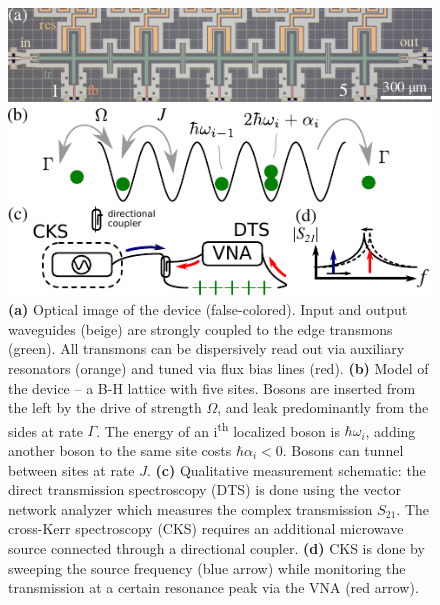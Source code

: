 \documentclass[%
 aps, prl,
 amsmath,amssymb,
 reprint,%
superscriptaddress
]{revtex4-2}
\begin{document}
\begin{figure}
	\centering
	\includegraphics[width=1\linewidth]{scheme.pdf}
	\caption{\textbf{(a)} Optical image of the device (false-colored). Input and output waveguides (beige) are strongly coupled to the edge transmons (green). All transmons can be dispersively read out via auxiliary resonators (orange) and tuned via flux bias lines (red). \textbf{(b)} Model of the device -- a B-H lattice with five sites. Bosons are inserted from the left by the drive of strength $\Omega$, and leak predominantly from the sides at rate $\Gamma$. The energy of an i\textsuperscript{{th}} localized boson is $\hbar \omega_i$, adding another boson to the same site costs $\hbar \alpha_i < 0$. Bosons can tunnel between sites at rate $J$. \textbf{(c)} Qualitative measurement schematic: the direct transmission spectroscopy (DTS) is done using the vector network analyzer which measures the complex transmission $ S_{21} $. The cross-Kerr spectroscopy (CKS) requires an additional microwave source connected through a directional coupler. \textbf{(d)} CKS is done by sweeping the source frequency (blue arrow) while monitoring the transmission at a certain resonance peak via the VNA (red arrow).}
	\label{fig:scheme}
\end{figure}
	
\end{document}
